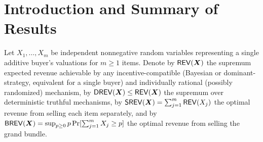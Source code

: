 \begin{abstract}
In \textbf{Part~II} (Lower Bound $\frac{439}{200} = 2.195$), we optimize within the entry-fee plus concentrating-bundle template of Giannakopoulos and Hahn by eliminating the free item group ($p_E = 0$) and distributing separate revenue across an exact-rational \emph{all-paid} eight-group equal-revenue spectrum ($N_a = 5{,}000$ items per group on the $1/100$ grid, entry fee $F = 7$, $S_A = \frac{1949}{400} = 4.8725$). Dual outward-rounded Rust and Python verifiers certify the exact degree-$699$ surplus polynomials, all $5{,}013$ finite-grid grand-bundle checks covering $(S_A, 55]$, and a Chernoff MGF tail covering $[55,\infty)$, achieving limiting ratio $\ge \RustCertLB$ and an explicit finite deterministic DSIC/IR witness at $N_b = 2^{46800}$, $\delta = S_A / 10^8$ strictly exceeding $\frac{439}{200}$ under every buyer tie-breaking rule.

Both parts are accompanied by a Lean~4 + Mathlib formalization (\texttt{MathForgeMechDesign}, $55$ audited theorems plus $21$ public helper lemmas, zero \texttt{sorry}, zero \texttt{native\_decide}) verifying reciprocal concavity, the discrete cap measure, the 3D moment polytope and Farkas decoupling, exact-rational binary tree validity and real-space box coverage, Time-Varying Jensen Alignment (from an abstract GH26 interface with concrete $m=1$ non-vacuity witness), 8-group PMF/$\REV$/$\SREV$, bundle-$B$ moments and variance, the explicit $N_b = 2^{46800}$ witness arithmetic, and DSIC/IR tie-breaking invariance.
\end{abstract}

\section{Introduction and Summary of Results}

Let $X_1,\dots,X_m$ be independent nonnegative random variables representing a single additive buyer's valuations for $m \ge 1$ items. Denote by $\mathsf{REV}(\bm{X})$ the supremum expected revenue achievable by any incentive-compatible (Bayesian or dominant-strategy, equivalent for a single buyer) and individually rational (possibly randomized) mechanism, by $\mathsf{DREV}(\bm{X}) \le \mathsf{REV}(\bm{X})$ the supremum over deterministic truthful mechanisms, by $\mathsf{SREV}(\bm{X}) = \sum_{j=1}^m \mathsf{REV}(X_j)$ the optimal revenue from selling each item separately, and by $\mathsf{BREV}(\bm{X}) = \sup_{p \ge 0} p\Pr[\sum_{j=1}^m X_j \ge p]$ the optimal revenue from selling the grand bundle.

